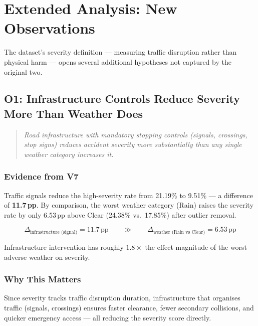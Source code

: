 
\section{Extended Analysis: New Observations}

The dataset's severity definition --- measuring traffic disruption rather than
physical harm --- opens several additional hypotheses not captured by the
original two.

\subsection{O1: Infrastructure Controls Reduce Severity More Than Weather Does}

\begin{quote}
  \itshape
  Road infrastructure with mandatory stopping controls (signals, crossings,
  stop signs) reduces accident severity more substantially than any single
  weather category increases it.
\end{quote}

\subsubsection*{Evidence from V7}

Traffic signals reduce the high-severity rate from 21.19\% to 9.51\% --- a
difference of \textbf{11.7\,pp}. By comparison, the worst weather category
(Rain) raises the severity rate by only 6.53\,pp above Clear (24.38\%
vs.\ 17.85\%) after outlier removal.

\begin{equation*}
  \Delta_{\text{infrastructure (signal)}} = 11.7\,\text{pp}
  \qquad \gg \qquad
  \Delta_{\text{weather (Rain vs Clear)}} = 6.53\,\text{pp}
\end{equation*}

Infrastructure intervention has roughly $\mathbf{1.8\times}$ the effect
magnitude of the worst adverse weather on severity.

\subsubsection*{Why This Matters}

Since severity tracks traffic disruption duration, infrastructure that organises
traffic (signals, crossings) ensures faster clearance, fewer secondary
collisions, and quicker emergency access --- all reducing the severity score
directly.

